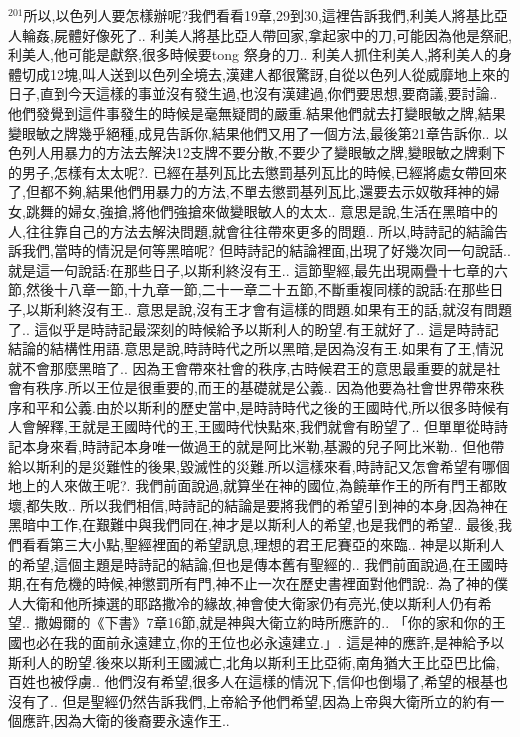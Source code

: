 \documentclass{book}
\begin{document}
$^{201}$所以,以色列人要怎樣辦呢?我們看看19章,29到30,這裡告訴我們,利美人將基比亞人輪姦,屍體好像死了..
利美人將基比亞人帶回家,拿起家中的刀,可能因為他是祭祀,利美人,他可能是獻祭,很多時候要tong 祭身的刀..
利美人抓住利美人,將利美人的身體切成12塊,叫人送到以色列全境去,漢建人都很驚訝,自從以色列人從威靡地上來的日子,直到今天這樣的事並沒有發生過,也沒有漢建過,你們要思想,要商議,要討論..
他們發覺到這件事發生的時候是毫無疑問的嚴重.結果他們就去打變眼敏之牌,結果變眼敏之牌幾乎絕種,成見告訴你,結果他們又用了一個方法,最後第21章告訴你..
以色列人用暴力的方法去解決12支牌不要分散,不要少了變眼敏之牌,變眼敏之牌剩下的男子,怎樣有太太呢?.
已經在基列瓦比去懲罰基列瓦比的時候,已經將處女帶回來了,但都不夠,結果他們用暴力的方法,不單去懲罰基列瓦比,還要去示奴敬拜神的婦女,跳舞的婦女,強搶,將他們強搶來做變眼敏人的太太..
意思是說,生活在黑暗中的人,往往靠自己的方法去解決問題,就會往往帶來更多的問題..
所以,時詩記的結論告訴我們,當時的情況是何等黑暗呢? 但時詩記的結論裡面,出現了好幾次同一句說話..
就是這一句說話:在那些日子,以斯利終沒有王..
這節聖經,最先出現兩疊十七章的六節,然後十八章一節,十九章一節,二十一章二十五節,不斷重複同樣的說話:在那些日子,以斯利終沒有王..
意思是說,沒有王才會有這樣的問題.如果有王的話,就沒有問題了..
這似乎是時詩記最深刻的時候給予以斯利人的盼望.有王就好了..
這是時詩記結論的結構性用語.意思是說,時詩時代之所以黑暗,是因為沒有王.如果有了王,情況就不會那麼黑暗了..
因為王會帶來社會的秩序,古時候君王的意思最重要的就是社會有秩序.所以王位是很重要的,而王的基礎就是公義..
因為他要為社會世界帶來秩序和平和公義.由於以斯利的歷史當中,是時詩時代之後的王國時代,所以很多時候有人會解釋,王就是王國時代的王,王國時代快點來,我們就會有盼望了..
但單單從時詩記本身來看,時詩記本身唯一做過王的就是阿比米勒,基澱的兒子阿比米勒..
但他帶給以斯利的是災難性的後果,毀滅性的災難.所以這樣來看,時詩記又怎會希望有哪個地上的人來做王呢?.
我們前面說過,就算坐在神的國位,為饒華作王的所有門王都敗壞,都失敗..
所以我們相信,時詩記的結論是要將我們的希望引到神的本身,因為神在黑暗中工作,在艱難中與我們同在,神才是以斯利人的希望,也是我們的希望..
最後,我們看看第三大小點,聖經裡面的希望訊息,理想的君王尼賽亞的來臨..
神是以斯利人的希望,這個主題是時詩記的結論,但也是傳本舊有聖經的..
我們前面說過,在王國時期,在有危機的時候,神懲罰所有門,神不止一次在歷史書裡面對他們說:.
為了神的僕人大衛和他所揀選的耶路撒冷的緣故,神會使大衛家仍有亮光,使以斯利人仍有希望..
撒姆爾的《下書》7章16節,就是神與大衛立約時所應許的..
「你的家和你的王國也必在我的面前永遠建立,你的王位也必永遠建立.」.
這是神的應許,是神給予以斯利人的盼望.後來以斯利王國滅亡,北角以斯利王比亞術,南角猶大王比亞巴比倫,百姓也被俘虜..
他們沒有希望,很多人在這樣的情況下,信仰也倒塌了,希望的根基也沒有了..
但是聖經仍然告訴我們,上帝給予他們希望,因為上帝與大衛所立的約有一個應許,因為大衛的後裔要永遠作王..
\end{document}
